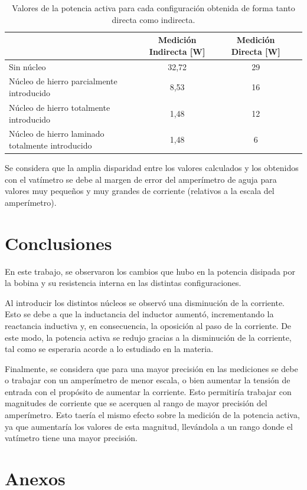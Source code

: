 \documentclass{article}
\begin{document}
            \begin{table}[h]
                \begin{tabular}{|p{5cm}|c|c|c|}
                \hline
                                                    & Medición Indirecta [W]   & Medición Directa [W] \\ \hline
                Sin núcleo                                        & 32,72                   & 29                        \\ \hline
                Núcleo de hierro parcialmente introducido            &       8,53        & 16                        \\ \hline
                Núcleo de hierro totalmente introducido             &      1,48          & 12                                 \\ \hline
                Núcleo de hierro laminado totalmente introducido   & 1,48               & 6              \\ \hline
                \end{tabular}
                \caption{Valores de la potencia activa para cada configuración obtenida de forma tanto directa como indirecta.}
                \label{tab:PotenciasActivas}
            \end{table}

            Se considera que la amplia disparidad entre los valores calculados y los obtenidos con el vatímetro se debe
            al margen de error del amperímetro de aguja para valores muy pequeños y muy grandes de corriente (relativos
            a la escala del amperímetro).

             
    \section{Conclusiones}
	En este trabajo, se observaron los cambios que hubo en la potencia disipada por la bobina y su resistencia interna en las distintas configuraciones. \par

Al introducir los distintos núcleos se observó una disminución de la corriente. Esto se debe a que la inductancia del inductor aumentó, incrementando la reactancia inductiva y, en consecuencia, la oposición al paso de la corriente. De este modo, la potencia activa se redujo gracias a la disminución de la corriente, tal como se esperaria acorde a lo estudiado en la materia. \par

Finalmente, se considera que para una mayor precisión en las mediciones se debe o trabajar con un amperímetro de menor escala, o bien aumentar la tensión de entrada con el propósito de aumentar la corriente. Esto permitiría trabajar con magnitudes de corriente que se acerquen al rango de mayor precisión del amperímetro. Esto taería el mismo efecto sobre la medición de la potencia activa, ya que aumentaría los valores de esta magnitud, llevándola a un rango donde el vatímetro tiene una mayor precisión.\par
    \section{Anexos}
\end{document}
